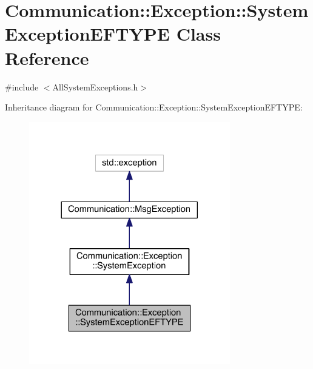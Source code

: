 \hypertarget{class_communication_1_1_exception_1_1_system_exception_e_f_t_y_p_e}{}\section{Communication\+:\+:Exception\+:\+:System\+Exception\+E\+F\+T\+Y\+P\+E Class Reference}
\label{class_communication_1_1_exception_1_1_system_exception_e_f_t_y_p_e}


{\ttfamily \#include $<$All\+System\+Exceptions.\+h$>$}



Inheritance diagram for Communication\+:\+:Exception\+:\+:System\+Exception\+E\+F\+T\+Y\+P\+E\+:\nopagebreak
\begin{figure}[H]
\begin{center}
\leavevmode
\includegraphics[width=248pt]{class_communication_1_1_exception_1_1_system_exception_e_f_t_y_p_e__inherit__graph}
\end{center}
\end{figure}


